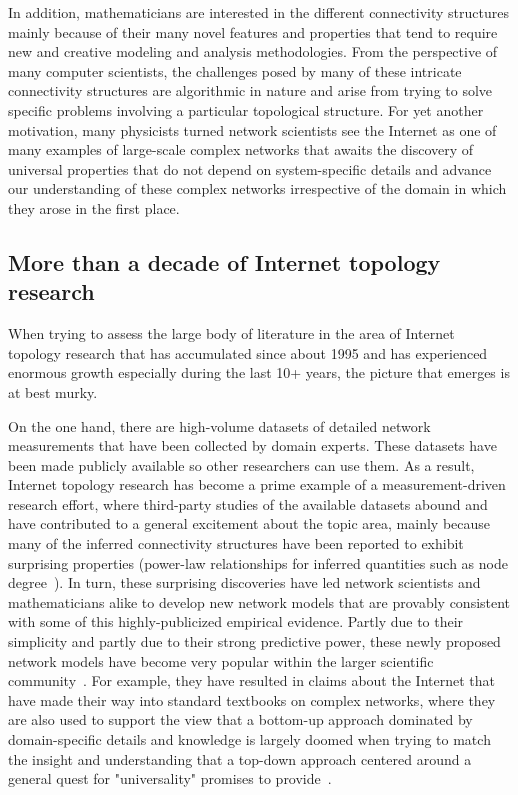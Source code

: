In addition, mathematicians are interested in the different
connectivity structures mainly because of their many novel features
and properties that tend to require new and creative modeling and
analysis methodologies. From the perspective of many computer
scientists, the challenges posed by many of these intricate
connectivity structures are algorithmic in nature and arise from
trying to solve specific problems involving a particular topological
structure. For yet another motivation, many physicists turned
network scientists see the Internet as one of many examples of
large-scale complex networks that awaits the discovery of universal
properties that do not depend on system-specific details and advance
our understanding of these complex networks irrespective of the domain
in which they arose in the first place.

\subsection{More than a decade of Internet topology research}

When trying to assess the large body of literature in the area of
Internet topology research that has accumulated since about 1995 and
has experienced enormous growth especially during the last 10+ years,
the picture that emerges is at best murky.

On the one hand, there are high-volume datasets of detailed network
measurements that have been collected by domain experts.  These
datasets have been made publicly available so other researchers can
use them.  As a result, Internet topology research has become a prime
example of a measurement-driven research effort, where third-party
studies of the available datasets abound and have contributed to a
general excitement about the topic area, mainly because many of the
inferred connectivity structures have been reported to exhibit
surprising properties (\eg power-law relationships for inferred
quantities such as node
degree~\cite{faloutsos99:_power_law_relat_of_inter_topol}). In turn,
these surprising discoveries have led network scientists and
mathematicians alike to develop new network models that are provably
consistent with some of this highly-publicized empirical evidence.
Partly due to their simplicity and partly due to their strong
predictive power, these newly proposed network models have become very
popular within the larger scientific
community~\cite{barabasi00,barabasi09:_scale_free_networ,barabasi12}. For
example, they have resulted in claims about the Internet that have made
their way into standard textbooks on complex networks, where they are
also used to support the view that a bottom-up approach dominated by
domain-specific details and knowledge is largely doomed when trying to
match the insight and understanding that a top-down approach centered
around a general quest for "universality" promises to
provide~\cite{barabasi02:_linked,dorogovtsev03:_evolut_networ,pastor-satorras04:_evolut_struc_inter,newman10:_networ}.

